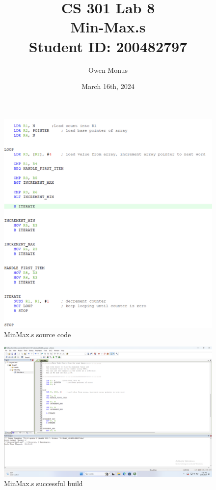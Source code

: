 \documentclass{article}
\begin{document}
\title{CS 301 Lab 8\\[0.5cm]\large Min-Max.s\\[0.5cm]\large Student ID: 200482797}
\author{Owen Monus}
\date{March 16th, 2024}

\maketitle

\pagebreak

\begin{figure}
\caption{MinMax.s source code}
\includegraphics[width=\textwidth]{../Images/minMax_source_code.png}
\end{figure}

\begin{figure}
\caption{MinMax.s successful build}
\includegraphics[width=\textwidth]{../Images/minMax_print_screen.png}
\end{figure}
\end{document}
